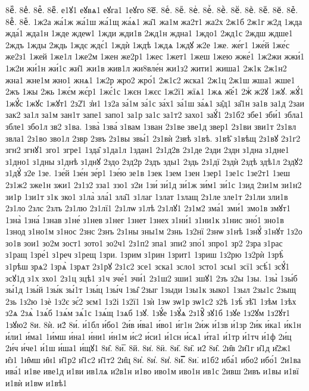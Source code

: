 {8еⷼ.
8еⷽ.
8еⷾ.
8еⷿ.
е1ꙋ1
еꙋвѧ1
еꙋга1
1еꙋго
8е꙯.
8еꙴ.
8еꙵ.
8еꙶ.
8еꙷ.
8еꙸ.
8еꙹ.
8еꙺ.
8еꙻ.
8е꙼.
8е꙽.
8еꚞ.
8еꚟ.
1ж2а
жа́1ж
жа́1ш
жа́1щ
жа́ѧ1
жа̑1
жа1м
жа2т1
жа2х
2ж1б
2ж1г
ж2д
1жда
жда́1
жда1н
1жде
ждеѡ1
1жди
жди1в
2жд1н
ждна1
1ждо1
2жд1с
2ждш
ждше1
2ждъ
1жды
2ждь
1ждє
ждє́1
1ждѝ
1ждѣ
1ждѧ
1ждꙋ
ж2е
1же.
же́г1
1же́й
1же́с
же2з1
1жей
1же1л
1же2м
1жен
же2р1
1жес
1жет1
1жеш
1жею
жже́1
1ж2жи
жжи́1
1ж2и
жи́1н
жи́1с
жи̑1
жи1в
жив1л
жи8вле́н
жи1з2
жити1
жиша1
2ж1к
2ж1н2
жна1
жне1м
жно1
жнѧ1
1ж2р
жро2
жро́1
2ж1с2
жска1
2ж1ц
2ж1ш
жша1
жше1
2жъ
1жы
2жь
1жє́м
жє́р1
1жє́1с
1жєн
1жєс
1ж2ї1
жїѧ1
1жѧ
ж҃е́1
2жⷭ
ж2ꙋ
1жꙋ.
жꙋ́1
1жꙋ́с
1жꙋс
1жꙋт1
2з2̾1
з̾и1
1з2а
за́1м
за́1с
за́х1
за́1ш
за́ѧ1
за̑д1
за̑1н
за1в
за1д
2заи
зак2
за1л
за1м
зан1т
запе1
запо1
за1р
за1с
за1т2
захо1
заꙋ́1
2з1б2
збе1
зби́1
збла1
збле1
збо1л
зв2
з1ва.
1зва̀
1зва́
з1вам
1зван
2з1ве
зве1д
звер1
2з1ви
зви1т
2з1вл
звла1
2з1во
зво1л
2звр
2звъ
2з1вы
звы́1
2з1вѝ
2звѣ
з1вѣ.
з1вѣ̑
з1вѣщ
2з1вꙋ
2з1г2
згн2
згнꙋ1
зго1
згре1
1зда̑
з1да1л
1здан1
2з1д2в
2з1де
2зди
2здн
з1дна
з1дне1
з1дно1
з1дны
з1днѣ
з1днꙋ
2здо
2зд2р
2здъ
зды1
2здь
2з1дї
2здѝ
2здѣ
здѣ1л
2здꙋ2
з1дꙋ́
з2е
1зе.
1зе́й
1зе́н
зе́р1
1зе́ю
зе1в
1зек
1зем
1зен
1зер1
1зе1с
1зе2т1
1зеш
2з1ж2
зже1н
зжи1
2з1з2
зза1
ззо1
з2и
1зи́
зи́1д
зи́1ж
зи́м1
зи́1с
1зид
2зи1м
зи1н2
зи1р
1зи1т
з1к
зко1
з1ла̀
зла́1
зла̑1
з1лаг
1злат
1злащ
2з1ле
зле1т
2з1ли
зли1в
2з1ло
2злс
2злъ
2з1лю
2з1лї1
2з1лѡ
з1лѣ
2з1лꙋ1
2з1м2
зма́1
зми́1
змо1в
змꙋт1
1зна̀
1зна́
1знав
з1не́
з1нев
з1нег
1знет
1знех
з1ни́1
з1ни1к
з1нис
зно́1
зно1в
1знод
з1но1м
з1нос
2знс
2знъ
2з1ны
зны1м
2знь
1з2нї
2знѡ
з1нѣ
1знꙋ́
з1нꙋт
1з2о
зо1в
зои1
зо2м
зост1
зото1
зо2ч1
2з1п2
зпа1
зпи2
зпо́1
зпро1
зр2
2зра
з1рас
з1ращ
1зре́1
з1реч
з1рещ
1зри.
1зрим
з1рин
1зрит1
1зриш
1з2рю
1з2рѝ
1зрѣ̀
з1рѣш
зрѧ2
1зрѧ̀
1зрѧт
2з1рꙋ
2з1с2
зсе1
зска1
зсло1
зсто1
зсы1
зсї1
зсѣ́1
зсꙋ́1
зсꙋ1д
з1х
зхо1
2з1ц
зцѣ1
з1ч
зче́1
зчи́1
2з1ш2
зши1
зшꙋ1
2зъ
з2ы
1зы.
1зы̀
1зы́б
зы́1д
1зы́й
1зы́к
зы́1т
1зы́ц
1зы́ч
1зы̑
2зыг
1зыди
1зы1к
зыко1
1зыл
2зы1с
2зыщ
2зь
1з2ю
1зѐ
1з2є
зє́2
зєм1
1з2і
1з2ї1
1зѝ
1зѡ
зѡ1р
зѡ1с2
з2ѣ
1зѣ̀
зѣ̑1
1зѣм
1зѣх
з2ѧ
2зѧ̀
1зѧ́б
1зѧ́м
зѧ́1с
1зѧ́щ
1зѧб
1зꙋ.
1зꙋ́е
1зꙋ́ѧ
2з1ꙋ̑
зꙋ1б
1зꙋе
1з2ꙋм
1з2ꙋт1
1зꙋю2
8и.
8ѝ.
и2́
8и́.
и́1бл
и́бо1
2и́в
и́ва1
и́во1
и́г1н
2и́ж
и́1зв
и́1зр
2и́к
и́ка1
и́к1н
и́ли1
и́ма1
1и́мш
и́на1
и́ни1
и́н1м
и́с2
и́си1
и́1сн
и́сѧ1
и́та1
и́1тр
и́1тч
и́1ф
2и́ц
2и́ч
и́че1
и́1ш
и́ша1
и́щꙋ1
8и̂.
8и̅.
8й.
8и̇.
8ӥ.
8и̋.
8и̏.
и2̑
8и̑.
2и̑в
2и̑1г
и̑1д
и̑2ж1
и̑з1
1и̑мш
и̑н1
и̑1р2
и̑1с2
и̑1т2
2и̑ц
8и̓.
8и̔.
8и̾.
8и̿.
8и͘.
и1б2
иба́1
ибо2
ибо́1
2и1ва
ива́1
и1ве
иве1д
и1ви
ив1лѧ
и2в1н
и1во
иво1м
иво1н
ив1с
2ивш
2ивъ
и1вы
и1вї
и1вѝ
и1вѡ
и1вѣ1
}
